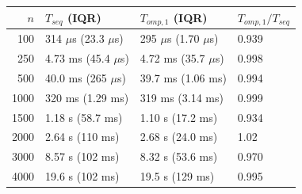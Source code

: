 \begin{tabular}{rlll}
\toprule
$n$ & $T_{seq}$ (IQR) & $T_{omp,1}$ (IQR) & $T_{omp,1}/T_{seq}$ \\
\midrule
100 & 314 $\mu$s (23.3 $\mu$s) & 295 $\mu$s (1.70 $\mu$s) & 0.939 \\
250 & 4.73 ms (45.4 $\mu$s) & 4.72 ms (35.7 $\mu$s) & 0.998 \\
500 & 40.0 ms (265 $\mu$s) & 39.7 ms (1.06 ms) & 0.994 \\
1000 & 320 ms (1.29 ms) & 319 ms (3.14 ms) & 0.999 \\
1500 & 1.18 s (58.7 ms) & 1.10 s (17.2 ms) & 0.934 \\
2000 & 2.64 s (110 ms) & 2.68 s (24.0 ms) & 1.02 \\
3000 & 8.57 s (102 ms) & 8.32 s (53.6 ms) & 0.970 \\
4000 & 19.6 s (102 ms) & 19.5 s (129 ms) & 0.995 \\
\bottomrule
\end{tabular}
